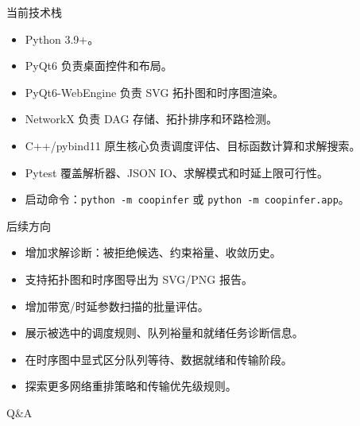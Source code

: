 \documentclass[aspectratio=169]{ctexbeamer}
\begin{document}
\begin{frame}{当前技术栈}
  \begin{itemize}
    \item Python 3.9+。
    \item PyQt6 负责桌面控件和布局。
    \item PyQt6-WebEngine 负责 SVG 拓扑图和时序图渲染。
    \item NetworkX 负责 DAG 存储、拓扑排序和环路检测。
    \item C++/pybind11 原生核心负责调度评估、目标函数计算和求解搜索。
    \item Pytest 覆盖解析器、JSON IO、求解模式和时延上限可行性。
    \item 启动命令：\texttt{python -m coopinfer} 或 \texttt{python -m coopinfer.app}。
  \end{itemize}
\end{frame}

\begin{frame}{后续方向}
  \begin{itemize}
    \item 增加求解诊断：被拒绝候选、约束裕量、收敛历史。
    \item 支持拓扑图和时序图导出为 SVG/PNG 报告。
    \item 增加带宽/时延参数扫描的批量评估。
    \item 展示被选中的调度规则、队列裕量和就绪任务诊断信息。
    \item 在时序图中显式区分队列等待、数据就绪和传输阶段。
    \item 探索更多网络重排策略和传输优先级规则。
  \end{itemize}
\end{frame}

\begin{frame}
  \centering
  \Huge Q\&A
\end{frame}
\end{document}

